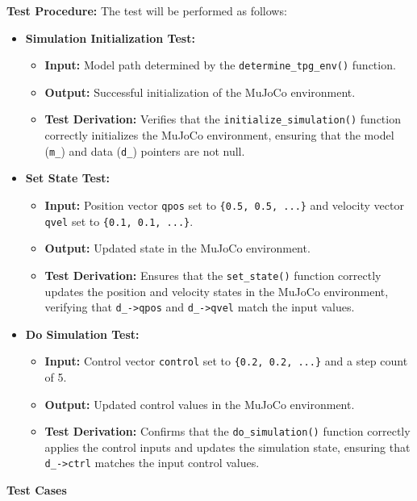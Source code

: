 \documentclass[12pt, titlepage]{article}
\begin{document}
\textbf{Test Procedure:} The test will be performed as follows:
\begin{itemize}
    \item \textbf{Simulation Initialization Test:}
    \begin{itemize}
        \item \textbf{Input:} Model path determined by the \texttt{determine\_tpg\_env()} function.
        \item \textbf{Output:} Successful initialization of the MuJoCo environment.
        \item \textbf{Test Derivation:} Verifies that the \texttt{initialize\_simulation()} function correctly initializes the MuJoCo environment, ensuring that the model (\texttt{m\_}) and data (\texttt{d\_}) pointers are not null.
    \end{itemize}

    \item \textbf{Set State Test:}
    \begin{itemize}
        \item \textbf{Input:} Position vector \texttt{qpos} set to \texttt{\{0.5, 0.5, ...\}} and velocity vector \texttt{qvel} set to \texttt{\{0.1, 0.1, ...\}}.
        \item \textbf{Output:} Updated state in the MuJoCo environment.
        \item \textbf{Test Derivation:} Ensures that the \texttt{set\_state()} function correctly updates the position and velocity states in the MuJoCo environment, verifying that \texttt{d\_->qpos} and \texttt{d\_->qvel} match the input values.
    \end{itemize}

    \item \textbf{Do Simulation Test:}
    \begin{itemize}
        \item \textbf{Input:} Control vector \texttt{control} set to \texttt{\{0.2, 0.2, ...\}} and a step count of 5.
        \item \textbf{Output:} Updated control values in the MuJoCo environment.
        \item \textbf{Test Derivation:} Confirms that the \texttt{do\_simulation()} function correctly applies the control inputs and updates the simulation state, ensuring that \texttt{d\_->ctrl} matches the input control values.
    \end{itemize}
\end{itemize}

\textbf{Test Cases}
\end{document}
